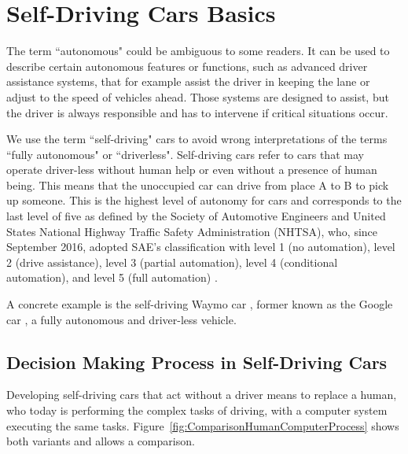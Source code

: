 \section{Self-Driving Cars Basics}
\label{sec:SelfDrivingCarsBasics}

The term ``autonomous" could be ambiguous to some readers. It can be used to describe certain autonomous features or functions, such as advanced driver assistance systems, that for example assist the driver in keeping the lane or adjust to the speed of vehicles ahead. Those systems are designed to assist, but the driver is always responsible and has to intervene if critical situations occur. 

We use the term ``self-driving" cars to avoid wrong interpretations of the terms ``fully autonomous" or ``driverless". Self-driving cars refer to cars that may operate driver-less without human help or even without a presence of human being. This means that the unoccupied car can drive from place A to B to pick up someone. This is the highest level of autonomy for cars and corresponds to the last level of five as defined by the Society of Automotive Engineers \cite{SAE2016} and United States National Highway Traffic Safety Administration (NHTSA), who, since September 2016, adopted SAE's classification with level 1 (no automation), level 2 (drive assistance), level 3 (partial automation), level 4 (conditional automation), and level 5 (full automation) \cite[p.9]{NationalHighwayTrafficSafetyAdministrationNHTSA2016}.

A concrete example is the self-driving Waymo car \cite{Waymo2017}, former known as the Google car \cite{Google2016}, a fully autonomous and driver-less vehicle. 


\subsection{Decision Making Process in Self-Driving Cars}
\label{sec:SelfDrivingCarsBasics:DecisionMakingProcess}

Developing self-driving cars that act without a driver means to replace a human, who today is performing the complex tasks of driving, with a computer system executing the same tasks. Figure~\ref{fig:ComparisonHumanComputerProcess} shows both variants and allows a comparison. 


